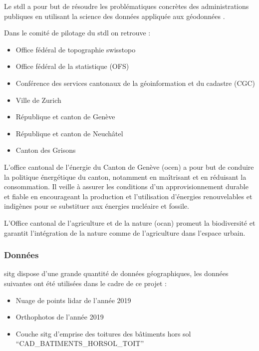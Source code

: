 \par{Le \acrshort{stdl} a pour but de résoudre les problématiques concrètes des administrations publiques en utilisant la science des données appliquée aux géodonnées \cite{stdl_swiss_nodate}.}

Dans le comité de pilotage du \acrshort{stdl} on retrouve :
\begin{itemize}
    \item Office fédéral de topographie swisstopo
    \item Office fédéral de la statistique (OFS)
    \item Conférence des services cantonaux de la géoinformation et du cadastre (CGC)
    \item Ville de Zurich
    \item République et canton de Genève
    \item République et canton de Neuchâtel
    \item Canton des Grisons
\end{itemize}

\par{L'office cantonal de l'énergie du Canton de Genève (\acrshort{ocen}) a pour but de conduire la politique énergétique du canton, notamment en maîtrisant et en réduisant la consommation. Il veille à assurer les conditions d'un approvisionnement durable et fiable en encourageant la production et l'utilisation d'énergies renouvelables et indigènes pour se substituer aux énergies nucléaire et fossile. \cite{etat_de_geneve_office_nodate-1}}

\par{L'Office cantonal de l'agriculture et de la nature (\acrshort{ocan}) promeut la biodiversité et garantit l'intégration de la nature comme de l'agriculture dans l'espace urbain. \cite{etat_de_geneve_office_nodate}}

\subsubsection{Données}

\par{\acrshort{sitg} dispose d'une grande quantité de données géographiques, les données suivantes ont été utilisées dans le cadre de ce projet :}
\begin{itemize}
    \item Nuage de points \gls{lidar} de l'année 2019 \cite{sitg_nuages_2019}
    \item Orthophotos de l'année 2019 \cite{sitg_orthophotos_nodate}
    \item Couche \acrshort{sitg} d'emprise des toitures des bâtiments hors sol ``CAD\_BATIMENTS\_HORSOL\_TOIT'' \cite{sitg_toits_nodate}
\end{itemize}

